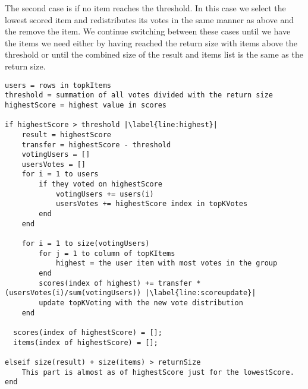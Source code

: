 The second case is if no item reaches the threshold. In this case we select the lowest scored item and redistributes its votes in the same manner as above and the remove the item. We continue switching between these cases until we have the items we need either by having reached the return size with items above the threshold or until the combined size of the result and items list is the same as the return size.

\begin{lstlisting}[caption={Implementation for the transfer method},label=lst:BTCtransfer,escapechar=|]
users = rows in topkItems
threshold = summation of all votes divided with the return size
highestScore = highest value in scores

if highestScore > threshold |\label{line:highest}|
	result = highestScore
	transfer = highestScore - threshold
	votingUsers = []
	usersVotes = []
	for i = 1 to users 
		if they voted on highestScore
			votingUsers += users(i)
			usersVotes += highestScore index in topKVotes
		end
	end
		
	for i = 1 to size(votingUsers)
		for j = 1 to column of topKItems
			highest = the user item with most votes in the group
		end
		scores(index of highest) += transfer * (usersVotes(i)/sum(votingUsers)) |\label{line:scoreupdate}|
		update topKVoting with the new vote distribution 
	end
	
  scores(index of highestScore) = [];
  items(index of highestScore) = [];
	
elseif size(result) + size(items) > returnSize
	This part is almost as of highestScore just for the lowestScore.
end

\end{lstlisting}